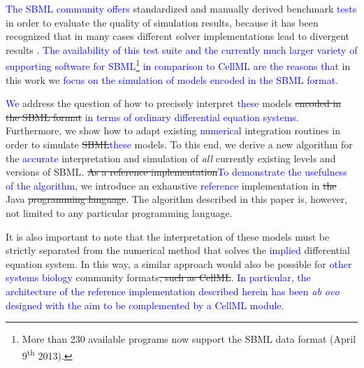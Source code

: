 \documentclass[10pt]{bmc_article}
\newenvironment{bmcformat}{\fussy\setboolean{publ}{true}}{\fussy}
\newcommand{\COR}[1]                      {\textcolor{blue}{#1}}
\begin{document}
\begin{bmcformat}
\COR{The \acs{SBML} community offers} standardized and manually derived benchmark
\COR{tests} in order to evaluate the quality of simulation results, because it
has been recognized that in many cases different solver implementations lead to
divergent results \cite{Bergmann2008}.
\COR{The availability of this test suite and the currently much larger variety
of supporting software for \acs{SBML}\footnote{More than 230 available programs
now support the \acs{SBML} data format (April 9\textsuperscript{th} 2013).} in
comparison to CellML are the reasons that}
in this work we
\COR{focus on the simulation of models encoded in the \acs{SBML} format.}
 
\COR{We} address the question of how to precisely interpret \COR{these} models
\sout{encoded in the \acs{SBML} format} \COR{in terms of ordinary differential equation systems}.
Furthermore, we show how to adapt existing \COR{numerical} integration routines
in order to simulate \sout{\acs{SBML}}\COR{these} models.
To this end, we derive a new algorithm for the \COR{accurate} interpretation and 
simulation of \emph{all} currently existing levels and versions of \acs{SBML}.
\sout{As a reference implementation}\COR{To demonstrate the usefulness of the algorithm},
we introduce an exhaustive \COR{reference} implementation in \sout{the}
Java\texttrademark{} \sout{programming language}. The algorithm described in this paper
is, however, not limited to any particular programming language.

It is also important to note that the interpretation of these models must be strictly
separated from the numerical method that solves the \COR{implied} differential
equation system. In this way, a similar approach would also be possible for
\COR{other systems biology} community formats\sout{, such as CellML}.
\COR{In particular, the architecture of the reference implementation described
herein has been \emph{ab ovo} designed with the aim to be complemented by a
CellML module.}


\end{bmcformat}
\end{document}
